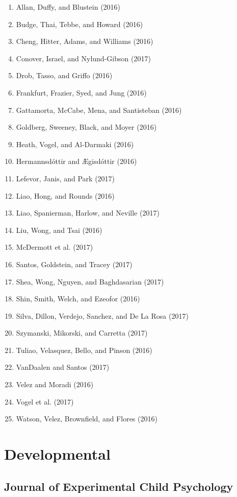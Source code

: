 \documentclass[english,man]{apa6}
\providecommand{\tightlist}{%
  \setlength{\itemsep}{0pt}\setlength{\parskip}{0pt}}
\begin{document}
\begin{enumerate}
\def\labelenumi{\arabic{enumi})}
\tightlist
\item
  Allan, Duffy, and Blustein (2016)
\item
  Budge, Thai, Tebbe, and Howard (2016)
\item
  Cheng, Hitter, Adams, and Williams (2016)
\item
  Conover, Israel, and Nylund-Gibson (2017)
\item
  Drob, Tasso, and Griffo (2016)
\item
  Frankfurt, Frazier, Syed, and Jung (2016)
\item
  Gattamorta, McCabe, Mena, and Santisteban (2016)
\item
  Goldberg, Sweeney, Black, and Moyer (2016)
\item
  Heath, Vogel, and Al-Darmaki (2016)
\item
  Hermannsdóttir and Ægisdóttir (2016)
\item
  Lefevor, Janis, and Park (2017)
\item
  Liao, Hong, and Rounds (2016)
\item
  Liao, Spanierman, Harlow, and Neville (2017)
\item
  Liu, Wong, and Tsai (2016)
\item
  McDermott et al. (2017)
\item
  Santos, Goldstein, and Tracey (2017)
\item
  Shea, Wong, Nguyen, and Baghdasarian (2017)
\item
  Shin, Smith, Welch, and Ezeofor (2016)
\item
  Silva, Dillon, Verdejo, Sanchez, and De La Rosa (2017)
\item
  Szymanski, Mikorski, and Carretta (2017)
\item
  Tuliao, Velasquez, Bello, and Pinson (2016)
\item
  VanDaalen and Santos (2017)
\item
  Velez and Moradi (2016)
\item
  Vogel et al. (2017)
\item
  Watson, Velez, Brownfield, and Flores (2016)
\end{enumerate}

\section{Developmental}\label{developmental}

\subsection{Journal of Experimental Child
Psychology}\label{journal-of-experimental-child-psychology}
\end{document}
